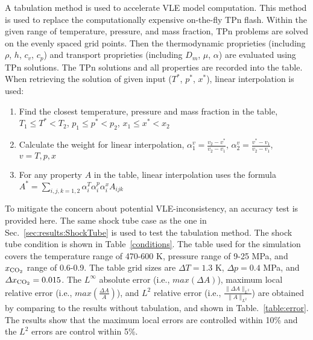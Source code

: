     A tabulation method is used to accelerate VLE model computation. This method is used to replace the computationally expensive on-the-fly TPn flash. Within the given range of temperature, pressure, and mass fraction, TPn problems are solved on the evenly spaced grid points. Then the thermodynamic proprieties (including $\rho$, $h$, $c_v$, $c_p$) and  transport  proprieties (including $D_m$, $\mu$, $\alpha$) are evaluated using TPn solutions. 
    The TPn solutions and all properties are recorded into the table. When retrieving the solution of given input ($T^*$, $p^*$, $x^*$), linear interpolation is used:
    \begin{enumerate}
     \item Find the closest temperature, pressure and mass fraction in the table, 
     $T_1 \leq T^* < T_2 $,
     $p_1 \leq p^* < p_2 $,
     $x_1 \leq x^* < x_2 $
     \item Calculate the weight for linear interpolation,
     $ \alpha^v_1=\frac{v_2-v^*}{v_2-v_1}$,
     $ \alpha^v_2=\frac{v^*-v_1}{v_2-v_1}$, $v=T,p,x$
     \item For any property $A$ in the table, linear interpolation uses the formula $A^* = \sum_{i,j,k=1,2}\alpha^T_i \alpha^p_i \alpha^x_i A_{ijk} $
    \end{enumerate}
    
    To mitigate the concern about potential VLE-inconsistency, an accuracy test is provided here. The same shock tube case as the one in Sec.~\ref{sec:results:ShockTube} is used to test the tabulation method. The shock tube condition is shown in Table~\ref{conditions}.
    The table used for the simulation covers the temperature range of 470-600 K, pressure range of 9-25 MPa, and $x_{\ce{CO2}}$ range of 0.6-0.9. The table grid sizes are $\Delta T = 1.3$ K, $\Delta p = 0.4$ MPa, and $\Delta x_{\ce{CO2}} = 0.015$.
    The $L^{\infty}$ absolute error (i.e., $max(\Delta A)$), maximum local relative error (i.e., $max(\frac{\Delta A}{A})$), and $L^2$ relative error (i.e., $ \frac{\|\Delta A\|_{L^2}}{\|A\|_{L^2}}$) are obtained by comparing to the results without tabulation, and shown in Table.~\ref{table:error}. The results show that the maximum local errors are controlled within 10\% and the $L^2$ errors are control within 5\%.

